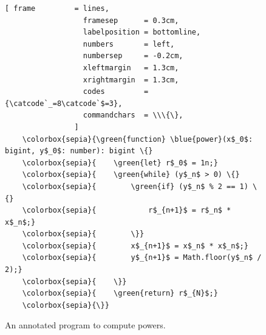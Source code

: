 \begin{figure}[!h]
\centering
\begin{Verbatim}[ frame         = lines, 
                  framesep      = 0.3cm, 
                  labelposition = bottomline,
                  numbers       = left,
                  numbersep     = -0.2cm,
                  xleftmargin   = 1.3cm,
                  xrightmargin  = 1.3cm,
                  codes         = {\catcode`_=8\catcode`$=3},
                  commandchars  = \\\{\},
                ]
    \colorbox{sepia}{\green{function} \blue{power}(x$_0$: bigint, y$_0$: number): bigint \{}
    \colorbox{sepia}{    \green{let} r$_0$ = 1n;}
    \colorbox{sepia}{    \green{while} (y$_n$ > 0) \{}
    \colorbox{sepia}{        \green{if} (y$_n$ % 2 == 1) \{}
    \colorbox{sepia}{            r$_{n+1}$ = r$_n$ * x$_n$;}
    \colorbox{sepia}{        \}}  
    \colorbox{sepia}{        x$_{n+1}$ = x$_n$ * x$_n$;}
    \colorbox{sepia}{        y$_{n+1}$ = Math.floor(y$_n$ / 2);}
    \colorbox{sepia}{    \}}  
    \colorbox{sepia}{    \green{return} r$_{N}$;}
    \colorbox{sepia}{\}}  
\end{Verbatim}
\vspace*{-0.3cm}
\caption{An annotated program to compute powers.}
\label{fig:power-iterative-annotated.stlx}
\end{figure} %

